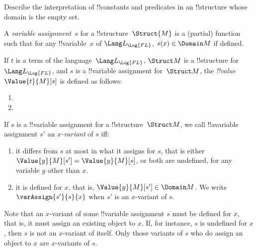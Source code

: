 \documentclass[../../../include/open-logic-section]{subfiles}
\begin{document}
\begin{prob}
Describe the interpretation of !!{constant}s and predicates in 
an !!{structure} whose domain is the empty set.
\end{prob}

\begin{defn}
A \emph{variable assignment}~$s$ for a !!{structure}~$\Struct{M}$ is a
(partial) function such that for any !!{variable}~$x$ of
  $\Lang L_{\Log{FL}}$, $s(x) \in \Domain M$ if defined. 
\end{defn}

\begin{defn}
If $t$ is a term of the language~$\Lang L_{\Log{FL}}$, $\Struct M$ is a
!!{structure} for~$\Lang L_{\Log{FL}}$, and $s$ is a !!{variable} assignment
for~$\Struct M$, the \emph{!!{value}}~$\Value{t}{M}[s]$ is defined as
follows:
\begin{enumerate}
\item {}
\item {}
\end{enumerate}
\end{defn}

\begin{defn}[$x$-Variant]
If $s$ is a !!{variable} assignment for a !!{structure}~$\Struct M$, we
call !!a{variable} assignment $s'$ an \emph{$x$-variant} of $s$ iff:
\begin{enumerate}
\item it differs from $s$ at most in what it assigns for $s$, that is 
either $\Value{y}{M}[s'] = \Value{y}{M}[s]$, or both are undefined, for
any variable $y$ other than $x$.
\item it is defined for $x$, that is, $\Value{y}{M}[s'] \in \Domain M$.
We write $\varAssign{s'}{s}{x}$ when $s'$ is an $x$-variant of $s$.
\end{enumerate}
\end{defn}

Note that an $x$-variant of some !!{variable} assignment $s$ must be 
defined for $x$, that is, it must assign an existing object to $x$. 
If, for instance, $s$ is undefined for $x$, then $s$ is not an $x$-variant
of itself. Only those variants of $s$ who do assign an object to $x$ 
are $x$-variants of $s$. 
\end{document}
